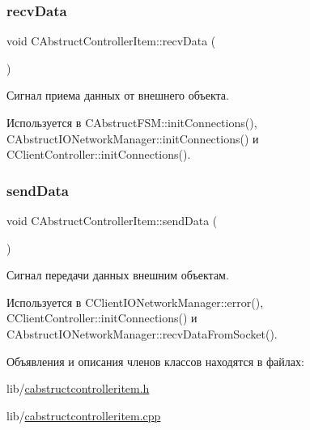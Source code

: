\hypertarget{class_c_abstruct_controller_item_a6898e48061cb0cac2065f8193bd386c1}{}\label{class_c_abstruct_controller_item_a6898e48061cb0cac2065f8193bd386c1} 
\subsubsection{\texorpdfstring{recv\+Data}{recvData}}
{\footnotesize\ttfamily void C\+Abstruct\+Controller\+Item\+::recv\+Data (\begin{DoxyParamCaption}\item[{Q\+String $\ast$}]{ }\end{DoxyParamCaption})\hspace{0.3cm}{\ttfamily [signal]}}



Сигнал приема данных от внешнего объекта. 



Используется в C\+Abstruct\+F\+S\+M\+::init\+Connections(), C\+Abstruct\+I\+O\+Network\+Manager\+::init\+Connections() и C\+Client\+Controller\+::init\+Connections().

\hypertarget{class_c_abstruct_controller_item_a7cf2bebc87a7d0b660318e946a176eb9}{}\label{class_c_abstruct_controller_item_a7cf2bebc87a7d0b660318e946a176eb9} 
\subsubsection{\texorpdfstring{send\+Data}{sendData}}
{\footnotesize\ttfamily void C\+Abstruct\+Controller\+Item\+::send\+Data (\begin{DoxyParamCaption}\item[{Q\+String $\ast$}]{ }\end{DoxyParamCaption})\hspace{0.3cm}{\ttfamily [signal]}}



Сигнал передачи данных внешним объектам. 



Используется в C\+Client\+I\+O\+Network\+Manager\+::error(), C\+Client\+Controller\+::init\+Connections() и C\+Abstruct\+I\+O\+Network\+Manager\+::recv\+Data\+From\+Socket().



Объявления и описания членов классов находятся в файлах\+:\begin{DoxyCompactItemize}
\item 
lib/\hyperlink{cabstructcontrolleritem_8h}{cabstructcontrolleritem.\+h}\item 
lib/\hyperlink{cabstructcontrolleritem_8cpp}{cabstructcontrolleritem.\+cpp}\end{DoxyCompactItemize}
